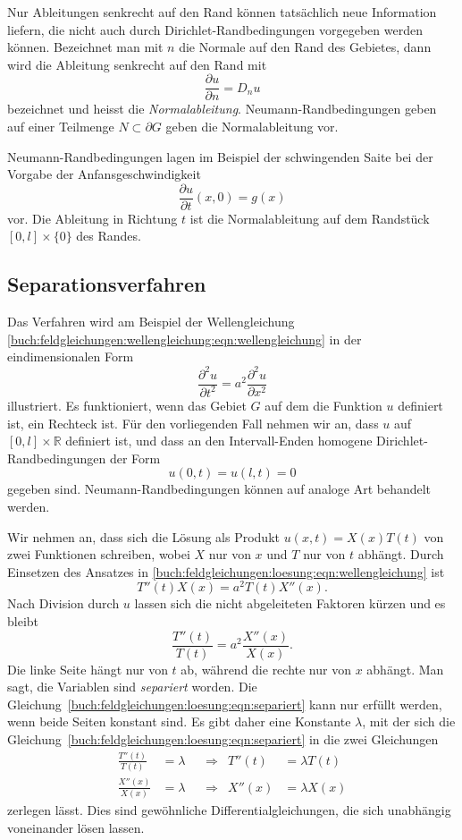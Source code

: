 Nur Ableitungen senkrecht auf den Rand können tatsächlich neue
Information liefern, die nicht auch durch Dirichlet-Randbedingungen
vorgegeben werden können.
Bezeichnet man mit $n$ die Normale auf den Rand des Gebietes,
dann wird die Ableitung senkrecht auf den Rand mit
\[
\frac{\partial u}{\partial n}
=
D_n u
\]
bezeichnet und heisst die {\em Normalableitung}.
%
Neumann-Randbedingungen geben auf einer Teilmenge $N\subset\partial G$
geben die Normalableitung vor.

Neumann-Randbedingungen lagen im Beispiel der schwingenden Saite bei
der Vorgabe der Anfansgeschwindigkeit
\[
\frac{\partial u}{\partial t}(x,0)
=
g(x)
\]
vor.
Die Ableitung in Richtung $t$ ist die Normalableitung auf dem Randstück
$[0,l]\times \{0\}$ des Randes.

\subsection{Separationsverfahren}
%
Das Verfahren wird am Beispiel der Wellengleichung
\eqref{buch:feldgleichungen:wellengleichung:eqn:wellengleichung}
in der eindimensionalen Form
\begin{equation}
\frac{\partial^2 u}{\partial t^2}
=
a^2
\frac{\partial^2 u}{\partial x^2}
\label{buch:feldgleichungen:loesung:eqn:wellengleichung}
\end{equation}
illustriert.
Es funktioniert, wenn das Gebiet $G$ auf dem die Funktion $u$
definiert ist, ein Rechteck ist.
Für den vorliegenden Fall nehmen wir an, dass $u$ auf
$[0,l]\times\mathbb{R}$ definiert ist, und dass an den
Intervall-Enden homogene Dirichlet-Randbedingungen der Form 
\[
u(0,t)=u(l,t)=0
\]
gegeben sind.
Neumann-Randbedingungen können auf analoge Art behandelt werden.

Wir nehmen an, dass sich die Lösung als Produkt $u(x,t)=X(x)T(t)$
von zwei Funktionen schreiben, wobei $X$ nur von $x$ und $T$ nur
von $t$ abhängt.
Durch Einsetzen des Ansatzes in
\eqref{buch:feldgleichungen:loesung:eqn:wellengleichung} 
ist
\[
T''(t) X(x)
=
a^2
T(t)
X''(x).
\]
Nach Division durch $u$ lassen sich die nicht abgeleiteten Faktoren
kürzen und es bleibt
\begin{equation}
\frac{T''(t)}{T(t)}
=
a^2
\frac{X''(x)}{X(x)}.
\label{buch:feldgleichungen:loesung:eqn:separiert}
\end{equation}
Die linke Seite hängt nur von $t$ ab, während die rechte nur von $x$
abhängt.
Man sagt, die Variablen sind {\em separiert} worden.
Die Gleichung~\eqref{buch:feldgleichungen:loesung:eqn:separiert}
kann nur erfüllt werden, wenn beide Seiten konstant sind.
Es gibt daher eine Konstante $\lambda$, mit der sich die
Gleichung~\eqref{buch:feldgleichungen:loesung:eqn:separiert}
in die zwei Gleichungen
\[
\begin{aligned}
\frac{T''(t)}{T(t)}&=\lambda &&\Rightarrow& T''(t) &= \lambda T(t) \\
\frac{X''(x)}{X(x)}&=\lambda &&\Rightarrow& X''(x) &= \lambda X(x)
\end{aligned}
\]
zerlegen lässt.
Dies sind gewöhnliche Differentialgleichungen, die sich unabhängig
voneinander lösen lassen.

